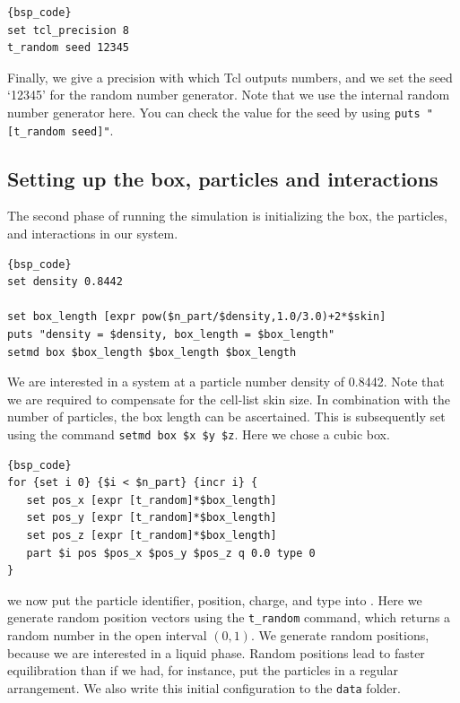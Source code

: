 \documentclass[
paper=a4,                       %
fontsize=11pt,                  %
twoside,                        %
footsepline,                    %
headsepline,                    %
headinclude=false,              %
footinclude=false,              %
pagesize,                       %
]{scrartcl}
\begin{document}
{\small\vspace{0,2cm}
\begin{lstlisting}[firstnumber= auto]{bsp_code}
set tcl_precision 8
t_random seed 12345
\end{lstlisting}\vspace{0,2cm}
}

\noindent Finally, we give a precision with which Tcl outputs numbers, and we set the seed `12345' for the random number generator. Note that we use the \es{} internal random number generator here. You can check the value for the seed by using \texttt{puts "[t\_random seed]"}.

\subsection{Setting up the box, particles and interactions}

The second phase of running the simulation is initializing the box, the particles, and interactions in our system.

{\small\vspace{0,2cm}
\begin{lstlisting}[firstnumber=auto]{bsp_code}
set density 0.8442

set box_length [expr pow($n_part/$density,1.0/3.0)+2*$skin]
puts "density = $density, box_length = $box_length"
setmd box $box_length $box_length $box_length
\end{lstlisting}\vspace{0,2cm}
}

\noindent We are interested in a system at a particle number density of 0.8442. Note that we are required to compensate for the cell-list skin size. In combination with the number of particles, the box length can be ascertained. This is subsequently set using the \es{} command \lstinline|setmd box $x $y $z|. Here we chose a cubic box.

{\small\vspace{0,2cm}
\begin{lstlisting}[firstnumber=auto]{bsp_code}
for {set i 0} {$i < $n_part} {incr i} {
   set pos_x [expr [t_random]*$box_length]
   set pos_y [expr [t_random]*$box_length]
   set pos_z [expr [t_random]*$box_length]
   part $i pos $pos_x $pos_y $pos_z q 0.0 type 0
}
\end{lstlisting}\vspace{0,2cm}
}

\noindent we now put the particle identifier, position, charge, and type into \es{}. Here we generate random position vectors using the \texttt{t\_random} command, which returns a random number in the open interval $(0,1)$. We generate random positions, because we are interested in a liquid phase. Random positions lead to faster equilibration than if we had, for instance, put the particles in a regular arrangement. We also write this initial configuration to the \texttt{data} folder.
\end{document}
